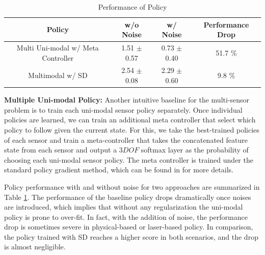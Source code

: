 \documentclass[../thesis.tex]{subfiles}
\begin{document}
 
\begin{table}[t]
    \vskip 0.1in
    \caption{Performance of Policy }
    \label{table:multiple-uni-baseline}
    \vskip 0.1in
    \centering
    \begin{small}
    \begin{sc}
    \begin{tabular}{c|cc|c}
    \toprule
    \centering
    Policy & w/o Noise & w/ Noise & Performance Drop \\ \midrule \midrule
     Multi Uni-modal w/ Meta Controller & 1.51 $\pm$ 0.57 & 0.73 $\pm$ 0.40 & 51.7 \% \\
     Multimodal w/ SD & 2.54 $\pm$ 0.08 & 2.29 $\pm$ 0.60 & 9.8 \% \\ \toprule
    \end{tabular}
    \end{sc}
    \end{small}
\end{table}
 
\textbf{Multiple Uni-modal Policy:}
Another intuitive baseline for the multi-sensor problem is to train each uni-modal sensor policy separately. Once individual policies are learned, we can train an additional meta controller that select which policy to follow given the current state.
For this, we take the best-trained policies of each sensor and train a meta-controller that takes the concatenated feature state from each sensor and output a $3 DOF$ softmax layer as the probability of choosing each uni-modal sensor policy. The meta controller is trained under the standard policy gradient method, which can be found in \cite{meta_policy} for more details.
 
Policy performance with and without noise for two approaches are summarized in Table \ref{table:multiple-uni-baseline}.
The performance of the baseline policy drops dramatically once noises are introduced, which implies that without any regularization the uni-modal policy is prone to over-fit. In fact, with the addition of noise, the performance drop is sometimes severe in physical-based or laser-based policy.
In comparison, the policy trained with SD reaches a higher score in both scenarios, and the drop is almost negligible.
 
 
 
\end{document}
